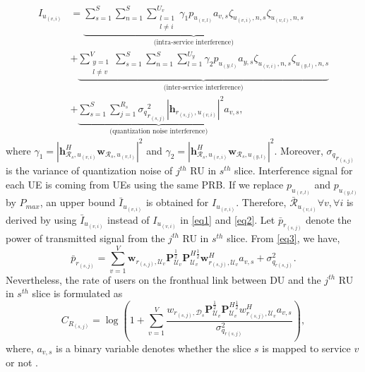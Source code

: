 \documentclass[conference]{IEEEtran}
\begin{document}
\begin{equation}
\begin{split}
 I_{u_{(v,i)}} &=
 \underbrace{\sum_{s=1}^{S}\sum_{n=1}^{S}\sum_{\substack{l=1 \\ l\neq i}}^{{U}_v} \gamma_{1}  p_{u_{(v,l)}}a_{v,s}\zeta_{u_(v,i),n,s}\zeta_{u_(v,l),n,s}}_{\text{(intra-service interference)}}\\
&+ \underbrace{\sum_{\substack{y=1 \\ l\neq v}}^{V}\sum_{s=1}^{S}\sum_{n=1}^{S}\sum_{l=1}^{{U}_y} \gamma_{2}  p_{u_{(y,l)}}a_{y,s} \zeta_{u_(v,i),n,s}\zeta_{u_(y,l),n,s}}_{\text{(inter-service interference)}}\\
&+\underbrace{ \sum_{s=1}^{S} \sum_{j=1}^{{R}_s} {\sigma_q}_{r_{(s,j)}}^2 |\boldsymbol{h}_{r_{(s,j)}, u_{(v,i)}}|^2 a_{v,s}}_{\text{(quantization noise interference)}},
\end{split}
\end{equation}
where $\gamma_{1} =|\boldsymbol{h}_{\mathcal{R}_s, u_{(v,i)}}^H \boldsymbol{w}_{\mathcal{R}_{s},u_{(v,l)}}|^2$
and $\gamma_{2} =|\boldsymbol{h}_{\mathcal{R}_s, u_{(v,i)}}^H \boldsymbol{w}_{\mathcal{R}_{s},u_{(y,l)}}|^2$. Moreover,
${\sigma_q}_{r_{(s,j)}}$ is the variance of quantization noise of $j^{th}$ RU in $s^{th}$ slice.
Interference signal for each UE is coming from UEs using the same PRB.
If we replace $p_{u_{(v,l)}}$ and $p_{u_{(y,l)}}$ by $P_{max}$, an upper bound $\bar{I}_{u_{(v,i)}}$ is obtained for $I_{u_{(v,i)}}$. Therefore, $\bar{\mathcal{R}}_{u_{(v,i)}} \forall v , \forall i$ is derived by using $\bar{I}_{u_{(v,i)}}$ instead of $I_{u_{(v,i)}}$ in  \eqref{eq1} and \eqref{eq2}.\newline
Let $\bar{p}_{r_{(s,j)}}$ denote the power of transmitted signal from the $j^{th}$ RU in $s^{th}$ slice.
From \eqref{eq3}, we have,
\begin{equation}
\bar{p}_{r_{(s,j)}} = \sum_{v=1}^{V}\boldsymbol{w}_{r_{(s,j)},\mathcal{U}_{v}} \boldsymbol{P}_{\mathcal{U}_v}^{\frac{1}{2}} \boldsymbol{P}_{\mathcal{U}_v}^{H \frac{1}{2}}   \boldsymbol{w}_{r_{(s,j)},\mathcal{U}_{v}}^H a_{v,s} + \sigma_{q_{r(s,j)}}^2.
\end{equation}
Nevertheless, the rate of users on the fronthual link between DU and the $j^{th}$ RU in $s^{th}$ slice is formulated as \cite{simeone2016cloud, 1111}
\begin{equation}
C_{R_{(s,j)}} = \log{(1+\sum_{v=1}^{V}\frac{w_{r_{(s,j)},\mathcal{D}_{s}} \boldsymbol{P}_{\mathcal{U}_v}^{\frac{1}{2}} \boldsymbol{P}_{\mathcal{U}_v}^{H \frac{1}{2}}   w_{r_{(s,j)},\mathcal{U}_{v}}^H a_{v,s}}{ \sigma_{q_{r(s,j)}}^2})},
\end{equation}
where, $a_{v,s}$ is a binary variable denotes whether the slice $s$ is mapped to service $v$ or not .
\end{document}
